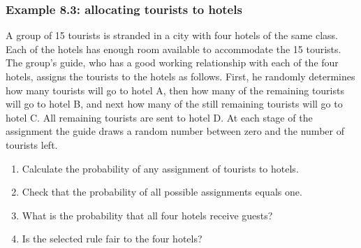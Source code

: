\begin{frame}
    \frametitle{Example 8.3: allocating tourists to hotels}

    \footnotesize
    \begin{manualProbExample}{8.3}
        A group of 15 tourists is stranded in a city with four hotels of the
        same class. Each of the hotels has enough room available to accommodate
        the 15 tourists. The group's guide, who has a good working relationship
        with each of the four hotels, assigns the tourists to the hotels as
        follows. First, he randomly determines how many tourists will go to
        hotel A, then how many of the remaining tourists will go to hotel B, and
        next how many of the still remaining tourists will go to hotel C. All
        remaining tourists are sent to hotel D. At each stage of the assignment
        the guide draws a random number between zero and the number of tourists
        left.
        \begin{enumerate}[a]
            \item Calculate the probability of any assignment of tourists to
                hotels.
            \item Check that the probability of all possible assignments equals
                one.
            \item What is the probability that all four hotels receive guests?
            \item Is the selected rule fair to the four hotels?
        \end{enumerate}
    \end{manualProbExample}
    \normalsize

\end{frame}


